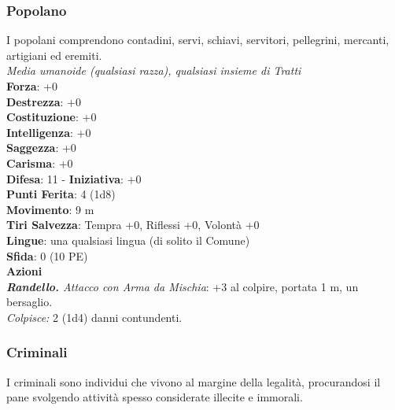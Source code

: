 \begin{multicols}{2}
\subsubsection{Popolano}
I popolani comprendono contadini, servi, schiavi, servitori, pellegrini, mercanti, artigiani ed eremiti.\\
\emph{Media umanoide (qualsiasi razza), qualsiasi insieme di Tratti}\\
\textbf{Forza}: +0\\
\textbf{Destrezza}: +0\\
\textbf{Costituzione}: +0\\
\textbf{Intelligenza}: +0\\
\textbf{Saggezza}: +0\\
\textbf{Carisma}: +0\\
\textbf{Difesa}: 11 - \textbf{Iniziativa}: +0\\
\textbf{Punti Ferita}: 4 (1d8)\\
\textbf{Movimento}: 9 m\\
\textbf{Tiri Salvezza}: Tempra +0, Riflessi +0, Volontà +0 \\
\textbf{Lingue}: una qualsiasi lingua (di solito il Comune)\\
\textbf{Sfida}: 0 (10 PE)\smallskip\\
\smallskip\textbf{Azioni}\\
\emph{\textbf{Randello.} Attacco con Arma da Mischia}: +3 al colpire, portata 1 m, un bersaglio.\\
\emph{Colpisce:} 2 (1d4) danni contundenti.\\

\subsubsection{Criminali}

I criminali sono individui che vivono al margine della legalità, procurandosi il pane svolgendo attività spesso considerate illecite e immorali.\\


\end{multicols}
